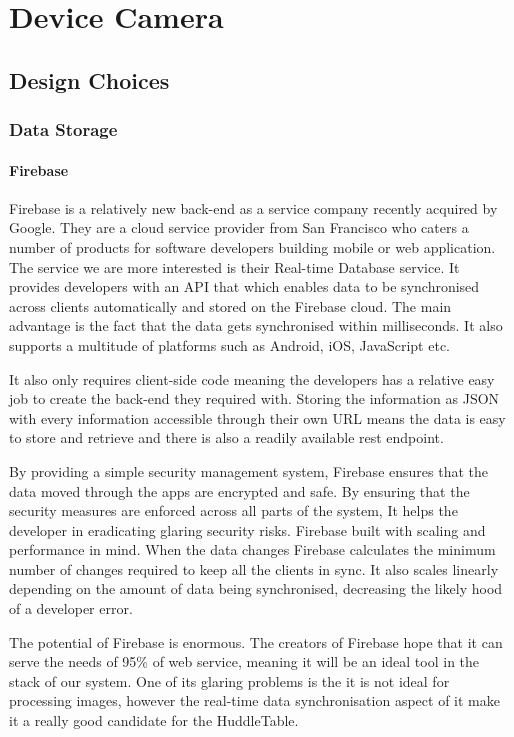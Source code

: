 \chapter{Device Camera}

\label{ch:devcamera}
\section{Design Choices}


\subsection{Data Storage}
\subsubsection{Firebase}

Firebase\cite{firebase} is a relatively new back-end as a service
company recently acquired by Google. They are a cloud service provider
from San Francisco who caters a number of products for software developers
building mobile or web application. The service we are more interested
is their Real-time Database service. It provides developers with an
API that which enables data to be synchronised across clients automatically
and stored on the Firebase cloud. The main advantage is the fact that
the data gets synchronised within milliseconds. It also supports a
multitude of platforms such as Android, iOS, JavaScript etc.

It also only requires client-side code meaning the developers has
a relative easy job to create the back-end they required with. Storing
the information as JSON with every information accessible through
their own URL means the data is easy to store and retrieve and there
is also a readily available rest endpoint. 

By providing a simple security management system, Firebase ensures
that the data moved through the apps are encrypted and safe. By ensuring
that the security measures are enforced across all parts of the system,
It helps the developer in eradicating glaring security risks. Firebase
built with scaling and performance in mind. When the data changes
Firebase calculates the minimum number of changes required to keep
all the clients in sync. It also scales linearly depending on the
amount of data being synchronised, decreasing the likely hood of a
developer error. 

The potential of Firebase is enormous. The creators of Firebase hope
that it can serve the needs of 95\% of web service\cite{firebase-wired},
meaning it will be an ideal tool in the stack of our system. One of
its glaring problems is the it is not ideal for processing images,
however the real-time data synchronisation aspect of it make it a
really good candidate for the HuddleTable.



